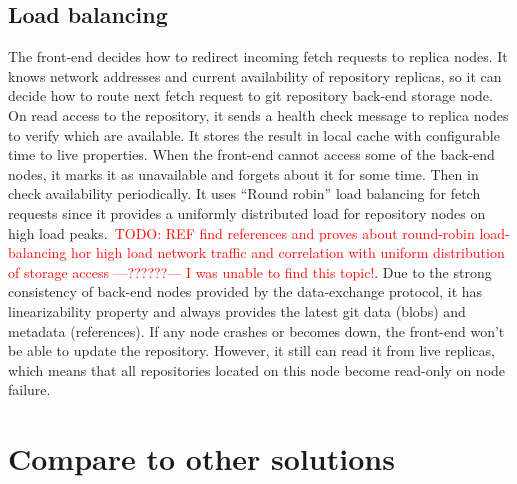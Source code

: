 \documentclass[acmlarge, screen, nonacm, 11pt]{acmart}
\newcommand{\todo}[1]{\textcolor{red}{TODO: #1}}
\begin{document}
\begin{itemize}
\subsection{Load balancing}\label{sec:load-balancing}

The front-end decides how to redirect incoming fetch requests to replica nodes.
It knows network addresses and current availability of repository replicas,
so it can decide how to route next fetch request to git repository back-end storage node.
On read access to the repository, it sends a health check message to replica nodes to verify
which are available. It stores the result in local cache with configurable time to live
properties. When the front-end cannot access some of the back-end nodes, it marks it as unavailable
and forgets about it for some time. Then in check availability periodically.
It uses ``Round robin'' load balancing for fetch requests since it provides a uniformly distributed
load for repository nodes on high load peaks.~\todo{REF find references and proves about round-robin
load-balancing hor high load network traffic and correlation with uniform distribution of storage access ---??????--- I was unable to find this topic!}.
Due to the strong consistency of back-end nodes provided by the data-exchange protocol,
it has linearizability property and always provides the latest git data (blobs) and metadata (references).
If any node crashes or becomes down, the front-end won't be able to update the repository. However, it still can read it from live replicas, which means that all repositories located on this
node become read-only on node failure.

\section{Compare to other solutions}\label{sec:compare}


\end{itemize}
\end{document}
